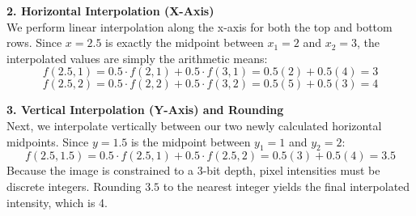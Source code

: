 \documentclass{article}
\begin{document}
\vspace{1em}
\textbf{2. Horizontal Interpolation (X-Axis)}\\
We perform linear interpolation along the x-axis for both the top and bottom rows. 
Since $x=2.5$ is exactly the midpoint between $x_1=2$ and $x_2=3$, the interpolated values are simply the arithmetic means:
\[
f(2.5, 1) = 0.5 \cdot f(2,1) + 0.5 \cdot f(3,1) = 0.5(2) + 0.5(4) = 3
\]
\[
f(2.5, 2) = 0.5 \cdot f(2,2) + 0.5 \cdot f(3,2) = 0.5(5) + 0.5(3) = 4
\]

\vspace{1em}
\textbf{3. Vertical Interpolation (Y-Axis) and Rounding}\\
Next, we interpolate vertically between our two newly calculated horizontal midpoints. 
Since $y=1.5$ is the midpoint between $y_1=1$ and $y_2=2$:
\[
f(2.5, 1.5) = 0.5 \cdot f(2.5, 1) + 0.5 \cdot f(2.5, 2) = 0.5(3) + 0.5(4) = 3.5
\]
Because the image is constrained to a 3-bit depth, pixel intensities must be discrete integers. 
Rounding $3.5$ to the nearest integer yields the final interpolated intensity, which is 4.
\end{document}
